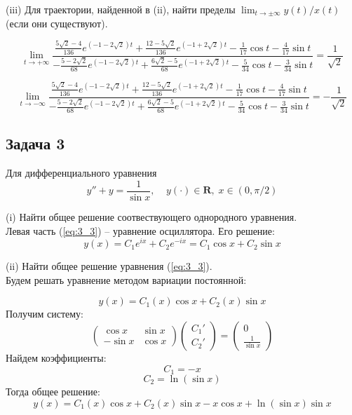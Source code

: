 \documentclass[a4paper, 12pt]{article}
\begin{document}
(iii) Для траектории, найденной в (ii), найти пределы $\lim_{t\rightarrow\pm\infty}y(t)/x(t)$ (если они существуют).


\[\lim_{t\rightarrow+\infty}\frac{\frac{5\sqrt{2}-4}{136} e^{(-1-2\sqrt 2)t}+\frac{12- 5\sqrt{2}}{136}e^{(-1+2\sqrt 2)t} -\frac {1} {17}\cos{t}-\frac {4} {17}\sin{t}}{-\frac{5-2\sqrt{2}}{68} e^{(-1-2\sqrt 2)t}+\frac{6\sqrt{2}- 5}{68} e^{(-1+2\sqrt 2)t} -\frac {5} {34}\cos{t}-\frac {3} {34}\sin{t}}=\frac {1} {\sqrt2} \]

\[\lim_{t\rightarrow-\infty}\frac{\frac{5\sqrt{2}-4}{136} e^{(-1-2\sqrt 2)t}+\frac{12- 5\sqrt{2}}{136}e^{(-1+2\sqrt 2)t} -\frac {1} {17}\cos{t}-\frac {4} {17}\sin{t}}{-\frac{5-2\sqrt{2}}{68} e^{(-1-2\sqrt 2)t}+\frac{6\sqrt{2}- 5}{68} e^{(-1+2\sqrt 2)t} -\frac {5} {34}\cos{t}-\frac {3} {34}\sin{t}}=-\frac {1} {\sqrt2}\]

	\subsection*{Задача 3}
Для дифференциального уравнения 
\begin{equation}
y''+y=\frac {1}{\sin x}, \;\;\;\; y(\cdot)\in \textbf{R},\; x\in (0,\pi/2)
\label{eq:3_3}
\end{equation}

(i) Найти общее решение соотвествующего однородного уравнения.\\
Левая часть (\ref{eq:3_3}) -- уравнение осциллятора. Его решение:
\[y(x)=C_1e^{ix}+C_2e^{-ix}=C_1\cos x+C_2\sin x\]

(ii) Найти общее решение уравнения (\ref{eq:3_3}).\\
Будем решать уравнение методом вариации постоянной:

\[y(x)= C_1(x)\cos x+C_2(x)\sin x\]
Получим систему:
\[ \left(
\begin{array}{cc}
\cos x & \sin x \\
-\sin x & \cos x
\end{array}
\right) \left(
\begin{array}{c}
C_1' \\
C_2'
\end{array} 
\right)= \left(
\begin{array}{c}
0 \\
\frac {1}{\sin x}
\end{array}
\right) \]
Найдем коэффициенты: 
\[C_1=-x\]
\[C_2=\ln(\sin x)\]
Тогда общее решение:
\[y(x)= C_1(x)\cos x+C_2(x)\sin x-x\cos x+\ln(\sin x)\sin x\]
\end{document}
